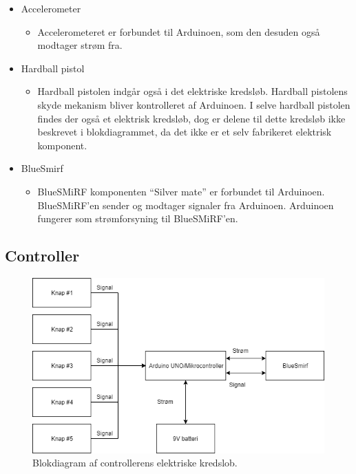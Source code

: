 \begin{itemize}
	\item Accelerometer
\begin{itemize}
\item Accelerometeret er forbundet til Arduinoen, som den desuden også modtager strøm fra.
\end{itemize}

	\item Hardball pistol 
\begin{itemize}
\item Hardball pistolen indgår også i det elektriske kredsløb. Hardball pistolens skyde mekanism bliver kontrolleret af Arduinoen. I selve hardball pistolen findes der også et elektrisk kredsløb, dog er delene til dette kredsløb ikke beskrevet i blokdiagrammet, da det ikke er et selv fabrikeret elektrisk komponent. 	
\end{itemize}

\item BlueSmirf
\begin{itemize}
\item BlueSMiRF komponenten “Silver mate” er forbundet til Arduinoen. BlueSMiRF’en sender og modtager signaler fra Arduinoen. Arduinoen fungerer som strømforsyning til BlueSMiRF’en.

\end{itemize}

\end{itemize}



\newpage
\subsection{Controller}

\begin{figure}[H]
\centering
\includegraphics[scale=0.8]{Billeder/Kredsloeb2.png}
\caption{Blokdiagram af controllerens elektriske kredslob.}
\label{fig:Blokdiagram2}
\end{figure}


